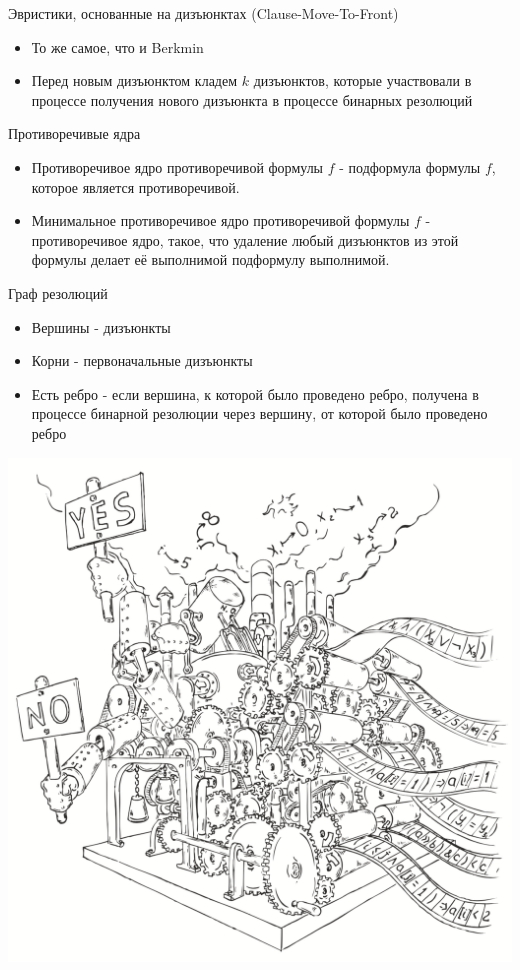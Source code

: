 \documentclass{beamer}
\begin{document}
\begin{frame}{Эвристики, основанные на дизъюнктах (Clause-Move-To-Front)}
\begin{itemize}
\item То же самое, что и Berkmin
\item Перед новым дизъюнктом кладем $k$ дизъюнктов, которые участвовали в процессе получения нового дизъюнкта в процессе
бинарных резолюций
\end{itemize}
\end{frame}

\begin{frame}{Противоречивые ядра}
\begin{itemize}
\item Противоречивое ядро противоречивой формулы $f$ - подформула формулы $f$, которое является противоречивой.
\item Минимальное противоречивое ядро противоречивой формулы $f$ - противоречивое ядро, такое, что удаление любый дизъюнктов из
этой формулы делает её выполнимой подформулу выполнимой.
\end{itemize}
\end{frame}

\begin{frame}{Граф резолюций}
\begin{itemize}
\item Вершины - дизъюнкты
\item Корни - первоначальные дизъюнкты
\item Есть ребро - если вершина, к которой было проведено ребро, получена в процессе бинарной резолюции через вершину, от
которой было проведено ребро
\end{itemize}
\end{frame}

\begin{frame}
\includegraphics[scale=0.5]{../decision-procedure.png}
\end{frame}
\end{document}
